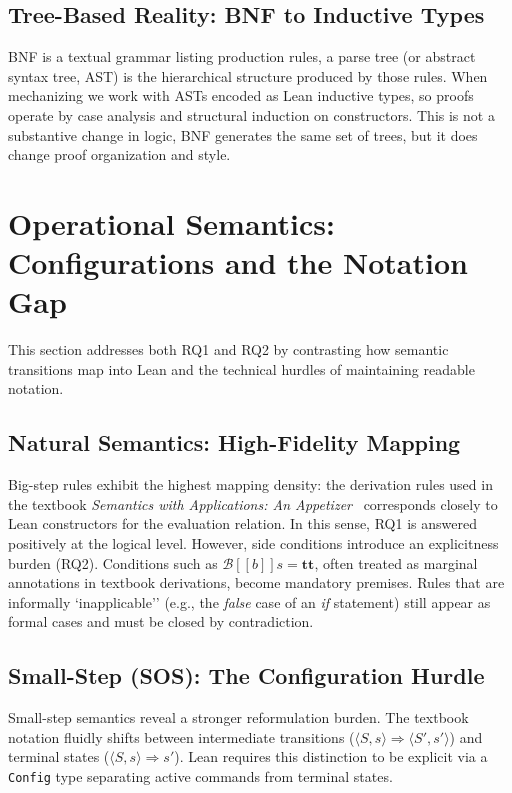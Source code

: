 \subsection*{Tree-Based Reality: BNF to Inductive Types}
BNF is a textual grammar listing production rules,
a parse tree (or abstract syntax tree, AST) is the hierarchical
structure produced by those rules.
When mechanizing we work with ASTs encoded as Lean inductive types,
so proofs operate by case analysis and structural induction on constructors.
This is not a substantive change in logic, BNF generates the same set of trees,
but it does change proof organization and style.


%
%
%
\section{Operational Semantics: Configurations and the Notation Gap}
\label{discussion:sec:operational_notation}

This section addresses both RQ1 and RQ2 by contrasting how semantic transitions
map into Lean and the technical hurdles of maintaining readable notation.

\subsection*{Natural Semantics: High-Fidelity Mapping}
Big-step rules exhibit the highest mapping density: the derivation rules used in the
textbook \emph{Semantics with Applications: An Appetizer}~\citep{nielson_semantics_2007} corresponds closely to Lean constructors for the evaluation relation.
In this sense, RQ1 is answered positively at the logical level. However, side
conditions introduce an explicitness burden (RQ2). Conditions such as
$\mathcal{B}[\![b]\!] s = \mathbf{tt}$, often treated as marginal annotations
in textbook derivations, become mandatory premises. Rules that are informally 
`inapplicable'' (e.g., the \textit{false} case of an \textit{if} statement)
still appear as formal cases and must be closed by contradiction.

\subsection*{Small-Step (SOS): The Configuration Hurdle}
Small-step semantics reveal a stronger reformulation burden.
The textbook notation fluidly shifts between intermediate transitions
($\langle S, s \rangle \Rightarrow \langle S', s' \rangle$) and terminal states
($\langle S, s \rangle \Rightarrow s'$). Lean requires this distinction to be
explicit via a \texttt{Config} type separating active commands from terminal states. 

